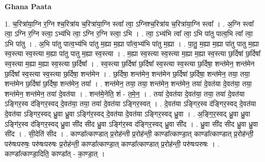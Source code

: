 \documentclass[17pt]{extarticle}
\begin{document}
\textbf{Ghana Paata } \newline

1. च॒रित्रा॑या॒ग्नि र॒ग्नि श्च॒रित्रा॑य च॒रित्रा॑या॒ग्नि स्त्वा᳚ त्वा॒ ऽग्निश्च॒रित्रा॑य च॒रित्रा॑या॒ग्नि स्त्वा᳚ । . अ॒ग्नि स्त्वा᳚ त्वा॒ ऽग्नि र॒ग्नि स्त्वा॒ ऽभ्य॑भि त्वा॒ ऽग्नि र॒ग्नि स्त्वा॒ ऽभि । . त्वा॒ ऽभ्य॑भि त्वा᳚ त्वा॒ ऽभि पा॑तु पात्व॒भि त्वा᳚ त्वा॒ ऽभि पा॑तु । . अ॒भि पा॑तु पात्व॒भ्य॑भि पा॑तु म॒ह्या म॒ह्या पा᳚त्व॒भ्य॑भि पा॑तु म॒ह्या । . पा॒तु॒ म॒ह्या म॒ह्या पा॑तु पातु म॒ह्या स्व॒स्त्या स्व॒स्त्या म॒ह्या पा॑तु पातु म॒ह्या स्व॒स्त्या । . म॒ह्या स्व॒स्त्या स्व॒स्त्या म॒ह्या म॒ह्या स्व॒स्त्या छ॒र्दिषा॑ छ॒र्दिषा᳚ स्व॒स्त्या म॒ह्या म॒ह्या स्व॒स्त्या छ॒र्दिषा᳚ । . स्व॒स्त्या छ॒र्दिषा॑ छ॒र्दिषा᳚ स्व॒स्त्या स्व॒स्त्या छ॒र्दिषा॒ शन्त॑मेन॒ शन्त॑मेन छ॒र्दिषा᳚ स्व॒स्त्या स्व॒स्त्या छ॒र्दिषा॒ शन्त॑मेन । . छ॒र्दिषा॒ शन्त॑मेन॒ शन्त॑मेन छ॒र्दिषा॑ छ॒र्दिषा॒ शन्त॑मेन॒ तया॒ तया॒ शन्त॑मेन छ॒र्दिषा॑ छ॒र्दिषा॒ शन्त॑मेन॒ तया᳚ । . शन्त॑मेन॒ तया॒ तया॒ शन्त॑मेन॒ शन्त॑मेन॒ तया॑ दे॒वत॑या दे॒वत॑या॒ तया॒ शन्त॑मेन॒ शन्त॑मेन॒ तया॑ दे॒वत॑या । . शन्त॑मे॒नेति॒ शं - त॒मे॒न॒ । . तया॑ दे॒वत॑या दे॒वत॑या॒ तया॒ तया॑ दे॒वत॑या ऽङ्गिर॒स्व द॑ङ्गिर॒स्वद् दे॒वत॑या॒ तया॒ तया॑ दे॒वत॑या ऽङ्गिर॒स्वत् । . दे॒वत॑या ऽङ्गिर॒स्व द॑ङ्गिर॒स्वद् दे॒वत॑या दे॒वत॑या ऽङ्गिर॒स्वद् ध्रु॒वा ध्रु॒वा ऽङ्गि॑र॒स्वद् दे॒वत॑या दे॒वत॑या ऽङ्गिर॒स्वद् ध्रु॒वा । . अ॒ङ्गि॒र॒स्वद् ध्रु॒वा ध्रु॒वा ऽङ्गि॑र॒स्व द॑ङ्गिर॒स्वद् ध्रु॒वा सी॑द सीद ध्रु॒वा ऽङ्गि॑र॒स्व द॑ङ्गिर॒स्वद् ध्रु॒वा सी॑द । . ध्रु॒वा सी॑द सीद ध्रु॒वा ध्रु॒वा सी॑द । . सी॒देति॑ सीद । . काण्डा᳚त्काण्डात् प्र॒रोह॑न्ती प्र॒रोह॑न्ती॒ काण्डा᳚त्काण्डा॒त् काण्डा᳚त्काण्डात् प्र॒रोह॑न्ती॒ परु॑षःपरुषः॒ परु॑षःपरुषः प्र॒रोह॑न्ती॒ काण्डा᳚त्काण्डा॒त् काण्डा᳚त्काण्डात् प्र॒रोह॑न्ती॒ परु॑षःपरुषः । . काण्डा᳚त्काण्डा॒दिति॒ काण्डा᳚त् - का॒ण्डा॒त् । \newline
\end{document}
